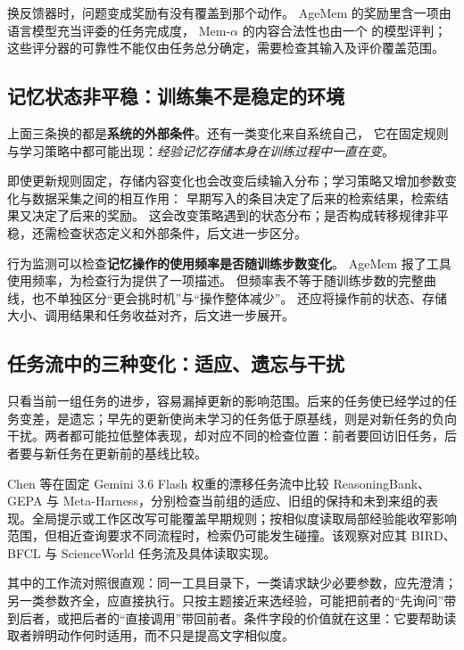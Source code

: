 换反馈器时，问题变成奖励有没有覆盖到那个动作。
AgeMem 的奖励里含一项由语言模型充当评委的任务完成度\cite{agemem-2601}，
Mem-$\alpha$ 的内容合法性也由一个  的模型评判\cite{memalpha-2509}；
这些评分器的可靠性不能仅由任务总分确定，需要检查其输入及评价覆盖范围。

\subsection*{记忆状态非平稳：训练集不是稳定的环境}

上面三条换的都是\textbf{系统的外部条件}。还有一类变化来自系统自己，
它在固定规则与学习策略中都可能出现：\emph{经验记忆存储本身在训练过程中一直在变}。

即使更新规则固定，存储内容变化也会改变后续输入分布；学习策略又增加参数变化与数据采集之间的相互作用：
早期写入的条目决定了后来的检索结果，检索结果又决定了后来的奖励。
这会改变策略遇到的状态分布；是否构成转移规律非平稳，还需检查状态定义和外部条件，后文进一步区分。

行为监测可以检查\textbf{记忆操作的使用频率是否随训练步数变化}。
AgeMem 报了工具使用频率\cite{agemem-2601}，为检查行为提供了一项描述。
但频率表不等于随训练步数的完整曲线，也不单独区分“更会挑时机”与“操作整体减少”。
还应将操作前的状态、存储大小、调用结果和任务收益对齐，后文进一步展开。

\subsection*{任务流中的三种变化：适应、遗忘与干扰}

只看当前一组任务的进步，容易漏掉更新的影响范围。后来的任务使已经学过的任务变差，是遗忘；早先的更新使尚未学习的任务低于原基线，则是对新任务的负向干扰。两者都可能拉低整体表现，却对应不同的检查位置：前者要回访旧任务，后者要与新任务在更新前的基线比较。

Chen 等在固定 Gemini 3.6 Flash 权重的漂移任务流中比较 ReasoningBank、GEPA 与 Meta-Harness，分别检查当前组的适应、旧组的保持和未到来组的表现\cite{continual-self-evolution-2610}。全局提示或工作区改写可能覆盖早期规则；按相似度读取局部经验能收窄影响范围，但相近查询要求不同流程时，检索仍可能发生碰撞。该观察对应其 BIRD、BFCL 与 ScienceWorld 任务流及具体读取实现。

其中的工作流对照很直观：同一工具目录下，一类请求缺少必要参数，应先澄清；另一类参数齐全，应直接执行。只按主题接近来选经验，可能把前者的“先询问”带到后者，或把后者的“直接调用”带回前者\cite{continual-self-evolution-2610}。条件字段的价值就在这里：它要帮助读取者辨明动作何时适用，而不只是提高文字相似度。

